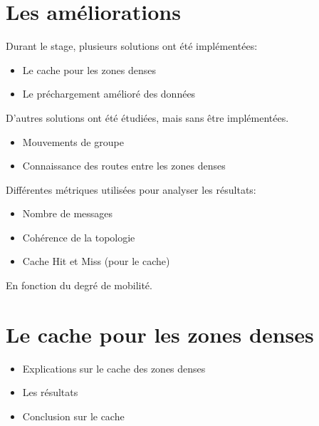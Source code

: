 \documentclass{beamer}
\begin{document}
  \section{Les améliorations}
  \begin{frame}
	Durant le stage, plusieurs solutions ont été implémentées:
	\begin{itemize}
		\pause\item Le cache pour les zones denses
		\pause\item Le préchargement amélioré des données
	\end{itemize}
	\pause D'autres solutions ont été étudiées, mais sans être implémentées.
	\begin{itemize}
		\item Mouvements de groupe
		\item Connaissance des routes entre les zones denses
	\end{itemize}
  \end{frame}

  \begin{frame}
	Différentes métriques utilisées pour analyser les résultats:
	\begin{itemize}
		\item Nombre de messages
		\item Cohérence de la topologie
		\item Cache Hit et Miss (pour le cache)
	\end{itemize}
	\vspace{5mm}
	En fonction du degré de mobilité.
  \end{frame}

  \section{Le cache pour les zones denses}
  \begin{frame}
	\vspace{1cm}
	\begin{itemize}
		\item Explications sur le cache des zones denses
		\item Les résultats 
		\item Conclusion sur le cache
	\end{itemize}
  \end{frame}
  
\end{document}
